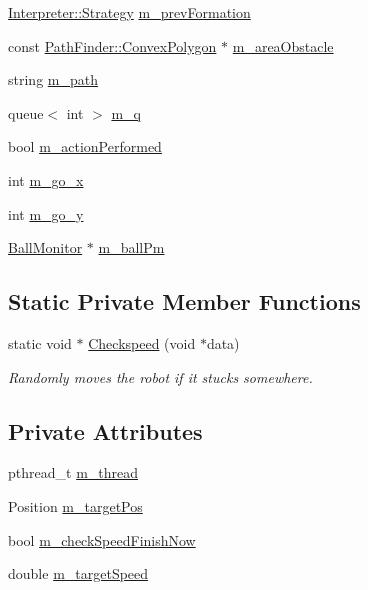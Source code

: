 \begin{DoxyCompactItemize}
\item 
\hyperlink{classInterpreter_a0fb49436c8c14ca79e13f1cd78119088}{Interpreter::Strategy} \hyperlink{classTeamRobot_ab32d14c3de4fd5a6ff6db39eb04f52f2}{m\_\-prevFormation}
\item 
const \hyperlink{structPathFinder_1_1ConvexPolygon}{PathFinder::ConvexPolygon} $\ast$ \hyperlink{classTeamRobot_af06d7a399ac2a3c24c27a7af1c6e38e5}{m\_\-areaObstacle}
\item 
string \hyperlink{classTeamRobot_af170b8d2e1b76b12f8cc83f6ec908e40}{m\_\-path}
\item 
queue$<$ int $>$ \hyperlink{classTeamRobot_a982ed6b6964c5e8b94519ef91b52c468}{m\_\-q}
\item 
bool \hyperlink{classTeamRobot_ab98a148247f0c8bbadac3cfc8fa268c8}{m\_\-actionPerformed}
\item 
int \hyperlink{classTeamRobot_ae4bafa3b5f0df155b1a45f95f6671316}{m\_\-go\_\-x}
\item 
int \hyperlink{classTeamRobot_ad0b6cee88278087238bf6fcecb419808}{m\_\-go\_\-y}
\item 
\hyperlink{classBallMonitor}{BallMonitor} $\ast$ \hyperlink{classTeamRobot_a84b5181a2fadaf7653d32f04fa04d657}{m\_\-ballPm}
\end{DoxyCompactItemize}
\subsection*{Static Private Member Functions}
\begin{DoxyCompactItemize}
\item 
static void $\ast$ \hyperlink{classTeamRobot_ac52f7f240fde40db09116e8639a53c21}{Checkspeed} (void $\ast$data)
\begin{DoxyCompactList}\small\item\em Randomly moves the robot if it stucks somewhere. \item\end{DoxyCompactList}\end{DoxyCompactItemize}
\subsection*{Private Attributes}
\begin{DoxyCompactItemize}
\item 
pthread\_\-t \hyperlink{classTeamRobot_a3e9052964ba03b6dce4a34d1e45dbb1f}{m\_\-thread}
\item 
Position \hyperlink{classTeamRobot_ab7446260b71870667a83b8c53e1274be}{m\_\-targetPos}
\item 
bool \hyperlink{classTeamRobot_ac4229cdeb227ab578cfe38023af2db59}{m\_\-checkSpeedFinishNow}
\item 
double \hyperlink{classTeamRobot_aaea621727542377ed5d5e1a316c5293c}{m\_\-targetSpeed}
\end{DoxyCompactItemize}


